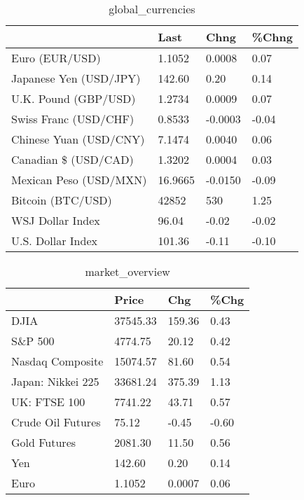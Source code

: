 \documentclass{article}%
\begin{document}
%


\begin{table}[htbp]%
\caption{global\_currencies}%
\centering%
\begin{adjustbox}{width=1\textwidth}%
\begin{tabular}{llll}
\toprule
                       &    Last &    Chng & \%Chng \\
\midrule
        Euro (EUR/USD) &  1.1052 &  0.0008 &  0.07 \\
Japanese Yen (USD/JPY) &  142.60 &    0.20 &  0.14 \\
  U.K. Pound (GBP/USD) &  1.2734 &  0.0009 &  0.07 \\
 Swiss Franc (USD/CHF) &  0.8533 & -0.0003 & -0.04 \\
Chinese Yuan (USD/CNY) &  7.1474 &  0.0040 &  0.06 \\
  Canadian \$ (USD/CAD) &  1.3202 &  0.0004 &  0.03 \\
Mexican Peso (USD/MXN) & 16.9665 & -0.0150 & -0.09 \\
     Bitcoin (BTC/USD) &   42852 &     530 &  1.25 \\
      WSJ Dollar Index &   96.04 &   -0.02 & -0.02 \\
     U.S. Dollar Index &  101.36 &   -0.11 & -0.10 \\
\bottomrule
\end{tabular}
%
\end{adjustbox}%
\end{table}

%


\begin{table}[htbp]%
\caption{market\_overview}%
\centering%
\begin{adjustbox}{width=1\textwidth}%
\begin{tabular}{llll}
\toprule
                  &    Price &    Chg &  \%Chg \\
\midrule
             DJIA & 37545.33 & 159.36 &  0.43 \\
          S\&P 500 &  4774.75 &  20.12 &  0.42 \\
 Nasdaq Composite & 15074.57 &  81.60 &  0.54 \\
Japan: Nikkei 225 & 33681.24 & 375.39 &  1.13 \\
     UK: FTSE 100 &  7741.22 &  43.71 &  0.57 \\
Crude Oil Futures &    75.12 &  -0.45 & -0.60 \\
     Gold Futures &  2081.30 &  11.50 &  0.56 \\
              Yen &   142.60 &   0.20 &  0.14 \\
             Euro &   1.1052 & 0.0007 &  0.06 \\
\bottomrule
\end{tabular}
%
\end{adjustbox}%
\end{table}

%
\end{document}
